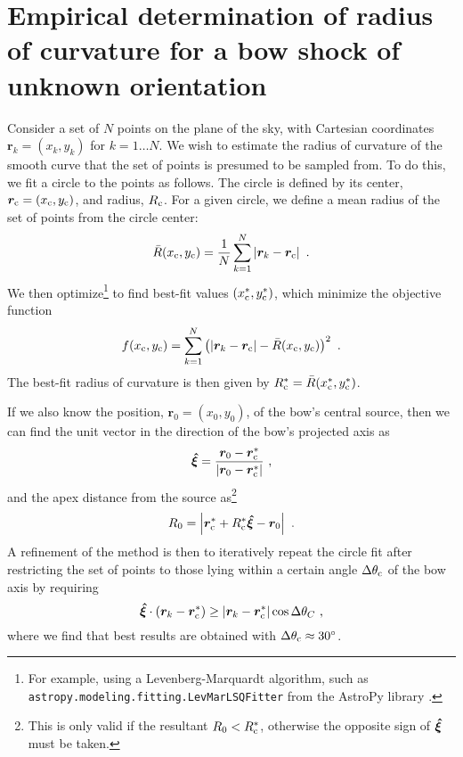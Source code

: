 \section{Empirical determination of radius of curvature for a bow shock of unknown orientation}
\label{app:rcurv-empirical}

Consider a set of \(N\) points on the plane of the sky, with Cartesian
coordinates \(\bm{r}_k = (x_k, y_k)\) for \(k = 1 \dots N\).  We wish
to estimate the radius of curvature of the smooth curve that the set
of points is presumed to be sampled from.  To do this, we fit a circle
to the points as follows.  The circle is defined by its center,
\(\bm{r}_{\mathrm{c}} = (x_{\mathrm{c}}, y_{\mathrm{c}})\), and radius, \(R_{\mathrm{c}}\).  For a
given circle, we define a mean radius of the set of points from the
circle center:
\begin{equation}
  \label{eq:rcurv-mean-radius}
  \bar{R}(x_{\mathrm{c}}, y_{\mathrm{c}}) = \frac{1}{N}  \sum_{k = 1}^{N} \left\lvert\bm{r}_k - \bm{r}_{\mathrm{c}}\right\rvert  \ .
\end{equation}
We then optimize\footnote{%
  For example, using a Levenberg-Marquardt algorithm, such as
  \texttt{astropy.modeling.fitting.LevMarLSQFitter} from the AstroPy
  library \citep{Astropy-Collaboration:2013a}.} %
to find best-fit values \((x_{\mathrm{c}}^*, y_{\mathrm{c}}^*)\), which minimize the
objective function
\begin{equation}
  \label{eq:rcurv-objective-function}
  f(x_{\C}, y_{\C}) = \sum_{k = 1}^{N} \left(
    \abs{\bm{r}_k - \bm{r}_{\C}}  - \bar{R} (x_{\C}, y_{\C}) \right)^2 \ .
\end{equation}
The best-fit radius of curvature is then given by
\(R_{\mathrm{c}}^* = \bar{R}(x_{\mathrm{c}}^*, y_{\mathrm{c}}^*)\).

If we also know the position, \(\bm{r}_0 = (x_0, y_0)\), of the bow's
central source, then we can find the unit vector in the direction of
the bow's projected axis as
\begin{equation}
  \label{eq:rcurv-axis-vector}
  \bm{\hat{\xi}} = \frac {\bm{r}_0 - \bm{r}_{\mathrm{c}}^*} { \lvert\bm{r}_0 - \bm{r}_{\mathrm{c}}^*\rvert} \ , 
\end{equation}
and the apex distance from the source as\footnote{%
  This is only valid if the resultant \(R_0 < R_{\mathrm{c}}^*\), otherwise
  the opposite sign of \(\bm{\hat{\xi}}\) must be taken.}
\begin{equation}
  \label{eq:rcurv-apex-distance}
  R_0 = \Abs{\bm{r}_{\C}^* + R_{\C}^* \uvec{\xi} - \bm{r}_0} \ .
\end{equation}
A refinement of the method is then to iteratively repeat the circle
fit after restricting the set of points to those lying within a
certain angle \(\Delta\theta_{\mathrm{c}}\) of the bow axis by requiring
\begin{equation}
  \label{eq:rcurv-delta-theta}
  \bm{\hat{\xi}} \cdot 
  {\left( \bm{r}_k - \bm{r}_{\ensuremath{\mathrm{c}}}^* \right) }
  \ge   {\left\lvert\bm{r}_k - \bm{r}_{\ensuremath{\mathrm{c}}}^*\right\rvert}
  \cos \Delta\theta_C \ ,
\end{equation}
where we find that best results are obtained with \(\Delta\theta_{\mathrm{c}} \approx \ang{30}\).

